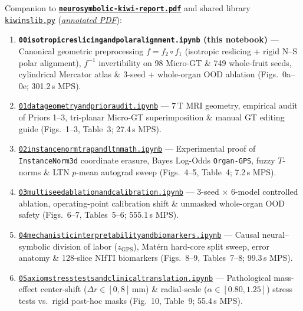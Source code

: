 \documentclass[10pt,a4paper]{article}
\renewcommand{\_}{\origunderscore\allowbreak}
\newcommand{\ghblob}{https://github.com/arvidl/BMED365-2027/blob/main}
\newcommand{\repodir}{Lab4-Comp-Imag/Kiwi-challenge/docs/neurosymbolic-report}
\begin{document}
\begin{seqbox}
{\footnotesize Companion to \href{\ghblob/\repodir/neurosymbolic-kiwi-report.pdf}{\textbf{\texttt{neurosymbolic-kiwi-report.pdf}}} and shared library \href{\ghblob/\repodir/notebooks/kiwi_ns_lib.py}{\texttt{kiwi\_ns\_lib.py}} (\href{\ghblob/\repodir/notebooks/kiwi_ns_lib_py.pdf}{\textit{annotated PDF}}):}
\begin{enumerate}[start=0, itemsep=1.2pt, topsep=2pt, font=\footnotesize]
    \item \textbf{\texttt{00\_isotropic\_reslicing\_and\_polar\_alignment.ipynb} (this notebook)} --- Canonical geometric preprocessing $f = f_2 \circ f_1$ (isotropic reslicing + rigid N--S polar alignment), $f^{-1}$ invertibility on 98 Micro-GT \& 749 whole-fruit seeds, cylindrical Mercator atlas \& 3-seed + whole-organ OOD ablation (Figs.\ 0a--0e; 301.2\,s MPS).
    \item \href{\ghblob/\repodir/notebooks/01_data_geometry_and_prior_audit.ipynb}{\texttt{01\_data\_geometry\_and\_prior\_audit.ipynb}} --- 7\,T MRI geometry, empirical audit of Priors 1--3, tri-planar Micro-GT superimposition \& manual GT editing guide (Figs.\ 1--3, Table~3; 27.4\,s MPS).
    \item \href{\ghblob/\repodir/notebooks/02_instancenorm_trap_and_ltn_math.ipynb}{\texttt{02\_instancenorm\_trap\_and\_ltn\_math.ipynb}} --- Experimental proof of \texttt{InstanceNorm3d} coordinate erasure, Bayes Log-Odds \texttt{Organ-GPS}, fuzzy $T$-norms \& LTN $p$-mean autograd sweep (Figs.\ 4--5, Table~4; 7.2\,s MPS).
    \item \href{\ghblob/\repodir/notebooks/03_multiseed_ablation_and_calibration.ipynb}{\texttt{03\_multiseed\_ablation\_and\_calibration.ipynb}} --- 3-seed $\times$ 6-model controlled ablation, operating-point calibration shift \& unmasked whole-organ OOD safety (Figs.\ 6--7, Tables~5--6; 555.1\,s MPS).
    \item \href{\ghblob/\repodir/notebooks/04_mechanistic_interpretability_and_biomarkers.ipynb}{\texttt{04\_mechanistic\_interpretability\_and\_biomarkers.ipynb}} --- Causal neural--symbolic division of labor ($z_{\text{GPS}}$), Mat\'ern hard-core split sweep, error anatomy \& 128-slice NIfTI biomarkers (Figs.\ 8--9, Tables~7--8; 99.3\,s MPS).
    \item \href{\ghblob/\repodir/notebooks/05_axiom_stress_tests_and_clinical_translation.ipynb}{\texttt{05\_axiom\_stress\_tests\_and\_clinical\_translation.ipynb}} --- Pathological mass-effect center-shift ($\Delta r \in [0, 8]$\,mm) \& radial-scale ($\alpha \in [0.80, 1.25]$) stress tests vs.\ rigid post-hoc masks (Fig.\ 10, Table~9; 55.4\,s MPS).
\end{enumerate}
\end{seqbox}
\end{document}
